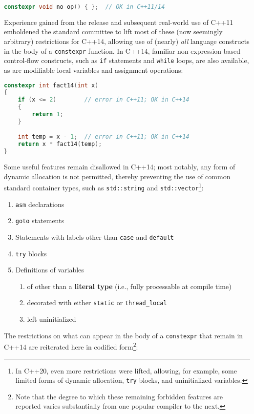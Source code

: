 \begin{lstlisting}[language=C++]
constexpr void no_op() { };  // OK in C++11/14
\end{lstlisting}

\noindent Experience gained from the release and subsequent real-world use of
C++11 emboldened the standard committee to lift most of these (now
seemingly arbitrary) restrictions for C++14, allowing use of (nearly)
\emph{all} language constructs in the body of a \texttt{constexpr}
function. In C++14, familiar non-expression-based control-flow
constructs, such as \texttt{if} statements and \texttt{while} loops, are
also available, as are modifiable local variables and assignment
operations:

\begin{lstlisting}[language=C++]
constexpr int fact14(int x)
{
    if (x <= 2)        // error in C++11; OK in C++14
    {
        return 1;
    }

    int temp = x - 1;  // error in C++11; OK in C++14
    return x * fact14(temp);
}
\end{lstlisting}

\noindent Some useful features remain disallowed in C++14; most notably, any form
of dynamic allocation is not permitted, thereby preventing the use of
common standard container types, such as \texttt{std::string} and
\texttt{std::vector}{\cprotect\footnote{In C++20, even more
restrictions were lifted, allowing, for example, some limited forms of
  dynamic allocation, \texttt{try} blocks, and uninitialized variables.}}:
\begin{enumerate}
\item{\texttt{asm} declarations}
\item{\texttt{goto} statements}
\item{Statements with labels other than \texttt{case} and \texttt{default}}
\item{\texttt{try} blocks}
\item{Definitions of variables
\begin{enumerate}
\item{of other than a \textbf{literal type} (i.e., fully processable at compile time)}
\item{decorated with either \texttt{static} or \texttt{thread\_local}}
\item{left uninitialized}
\end{enumerate}
}
\end{enumerate}
The restrictions on what can appear in the body of a \texttt{constexpr}
that remain in C++14 are reiterated here in codified
form\footnote{Note that the degree to which these remaining forbidden features are reported varies substantially from one popular compiler to the next.}:

